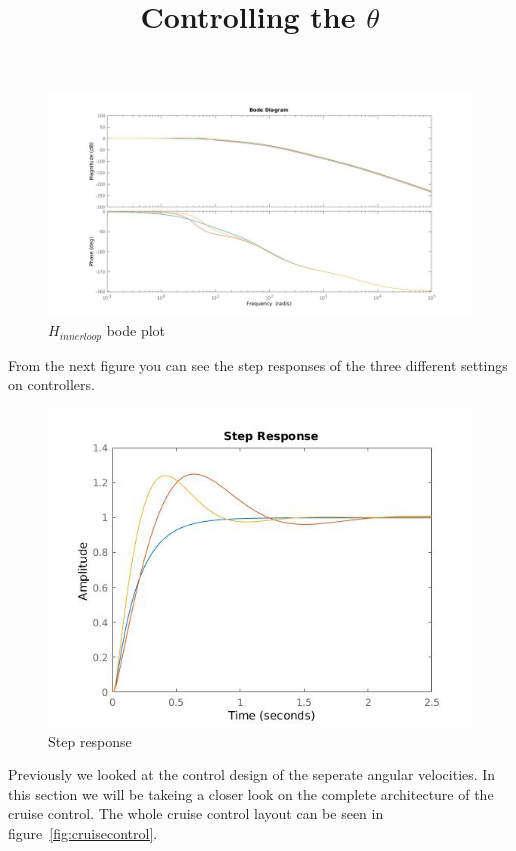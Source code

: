 \begin{figure}
\centering
 	\includegraphics[width=1\textwidth]{figures/Hinnerbode.jpg}
	
	
	\caption{$H_{innerloop}$ bode plot} 
 	\label{fig:hinnerloopbode} 
\end{figure}

From the next figure you can see the step responses of the three different settings on controllers.

\begin{figure}
\centering
 	\includegraphics[width=1\textwidth]{figures/stepresponse.jpg}
	
	
	\caption{Step response} 
 	\label{fig:stepresponse} 
\end{figure}

\title{Controlling the $\theta$}

Previously we looked at the control design of the seperate angular velocities. In this section we will be takeing a closer look on the complete architecture of the cruise control. The whole cruise control layout can be seen in figure~\ref{fig:cruisecontrol}.

